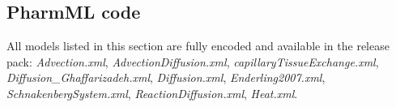 %
%


\subsection{PharmML code}
\label{subsec:PDEPharmMLcode}


All models listed in this section are fully encoded and available
in the release pack: \emph{Advection.xml}, \emph{AdvectionDiffusion.xml},
\emph{capillaryTissueExchange.xml}, \emph{Diffusion\_Ghaffarizadeh.xml}, 
\emph{Diffusion.xml}, \emph{Enderling2007.xml}, \emph{SchnakenbergSystem.xml}, 
\emph{ReactionDiffusion.xml}, \emph{Heat.xml}.









%
%
%
%









